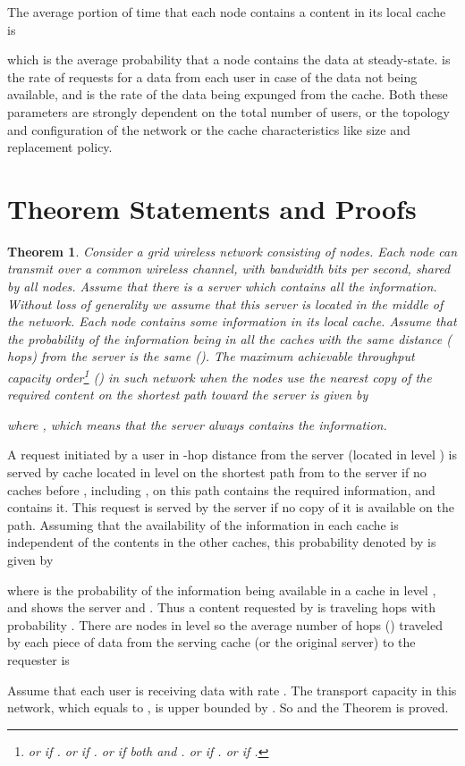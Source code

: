 \documentclass[journal]{IEEEtran}
\theoremstyle{plain}
\newtheorem{theorem}{Theorem}
\theoremstyle{remark}
\begin{document}
The average portion of time that each node contains a content in its local cache is

which is the average probability that a node contains the data at steady-state.  is the rate of requests for a data from each user in case of the data not being  available, and  is the rate of the data being expunged from the cache. Both these parameters are strongly dependent on the total number of users, or the topology and configuration of the network or the cache characteristics like size and replacement policy. 


\section{Theorem Statements and Proofs}
\label{sec:theorems}

\begin{theorem} \label{thm:01}
Consider a grid wireless network consisting of  nodes. Each node can transmit over a common wireless channel, with bandwidth  bits per second, shared by all nodes. Assume that there is a server which contains all the information. Without loss of generality we assume that this server is located in the middle of the network. Each node contains some information in its local cache. Assume that the probability of the information being in all the caches with the same distance ( hops) from the server is the same (). The maximum achievable throughput capacity order\footnote{ or  if .  or  if .  or  if both  and .  or  if .  or  if .} () in such network when the nodes use the nearest copy of the required content on the shortest path toward the server is given by


	
where , which means that the server always contains the information.

\end{theorem}

\begin{IEEEproof}
A request initiated by a user  in -hop distance from the server (located in level ) is served by cache  located in level  on the shortest path from  to the server if no caches before , including , on this path contains the required information, and  contains it. This request is served by the server if no copy of it is available on the path. Assuming that the availability of the information in each cache is independent of the contents in the other caches, this probability denoted by  is given by



where  is the probability of the information being available in a cache in level , and  shows the server and . Thus a content requested by  is traveling  hops with probability . There are  nodes in level  so the average number of hops () traveled by each piece of data from the serving cache (or the original server) to the requester is




Assume that each user is receiving data with rate . The transport capacity in this network, which equals to , is upper bounded by . So  and the Theorem is proved.
\end{IEEEproof}
\end{document}
